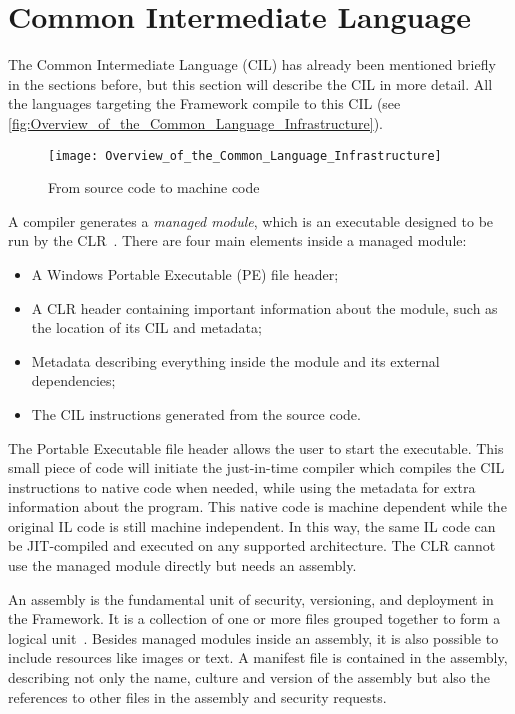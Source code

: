 \section{Common Intermediate Language}
\label{sec:TheIntermediateLanguage}
The Common Intermediate Language (CIL) has already been mentioned briefly in the sections before, but this section will describe the CIL in more detail.
All the languages targeting the \dotNET Framework compile to this CIL (see \autoref{fig:Overview_of_the_Common_Language_Infrastructure}).

\begin{figure}
  \centering
  \texttt{[image: Overview\_of\_the\_Common\_Language\_Infrastructure]}
  \caption{From source code to machine code}
  \label{fig:Overview_of_the_Common_Language_Infrastructure}
\end{figure}

A \dotNET compiler generates a \emph{managed module}, which is an executable designed to be run by the CLR~\cite{Prosise2002}.
There are four main elements inside a managed module:

\begin{itemize}[noitemsep]
  \item A Windows Portable Executable (PE) file header;
  \item A CLR header containing important information about the module, such as the location of its CIL and metadata;
  \item Metadata describing everything inside the module and its external dependencies;
  \item The CIL instructions generated from the source code.
\end{itemize}

The Portable Executable file header allows the user to start the executable.
This small piece of code will initiate the just-in-time compiler which compiles the CIL instructions to native code when needed, while using the metadata for extra information about the program.
This native code is machine dependent while the original IL code is still machine independent.
In this way, the same IL code can be JIT-compiled and executed on any supported architecture.
The CLR cannot use the managed module directly but needs an assembly. 

An assembly is the fundamental unit of security, versioning, and deployment in the \dotNET Framework. It is a collection of one or more files grouped together to form a logical unit~\cite{Prosise2002}.
Besides managed modules inside an assembly, it is also possible to include resources like images or text.
A manifest file is contained in the assembly, describing not only the name, culture and version of the assembly but also the references to other files in the assembly and security requests.

